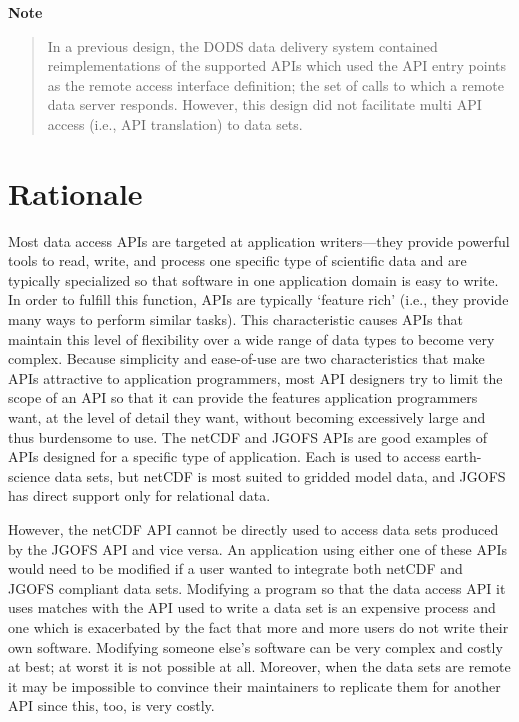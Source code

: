 \begin{center}
{\bf Note}
\begin{quote}
In a previous design, the DODS data delivery system contained
reimplementations of the supported APIs which used the API entry points as
the remote access interface definition; the set of calls to which a remote
data server responds. However, this design did not facilitate multi API
access (i.e., API translation) to data sets.
\end{quote}
\end{center}

\section{Rationale}

Most data access APIs are targeted at application writers---they provide
powerful tools to read, write, and process one specific type of scientific
data and are typically specialized so that software in one application domain
is easy to write. In order to fulfill this function, APIs are typically
`feature rich' (i.e., they provide many ways to perform similar tasks). This
characteristic causes APIs that maintain this level of flexibility over a
wide range of data types to become very complex. Because simplicity and
ease-of-use are two characteristics that make APIs attractive to application
programmers, most API designers try to limit the scope of an API so that it
can provide the features application programmers want, at the level of detail
they want, without becoming excessively large and thus burdensome to use.
The netCDF and JGOFS APIs are good examples of APIs designed for a specific
type of application.  Each is used to access earth-science data sets, but
netCDF is most suited to gridded model data, and JGOFS has direct support
only for relational data.

However, the netCDF API cannot be directly used to access data sets produced
by the JGOFS API and vice versa. An application using either one of these
APIs would need to be modified if a user wanted to integrate both netCDF and
JGOFS compliant data sets. Modifying a program so that the data access API it
uses matches with the API used to write a data set is an expensive process
and one which is exacerbated by the fact that more and more users do not
write their own software. Modifying someone else's software can be very
complex and costly at best; at worst it is not possible at all.  Moreover,
when the data sets are remote it may be impossible to convince their
maintainers to replicate them for another API since this, too, is very
costly.

